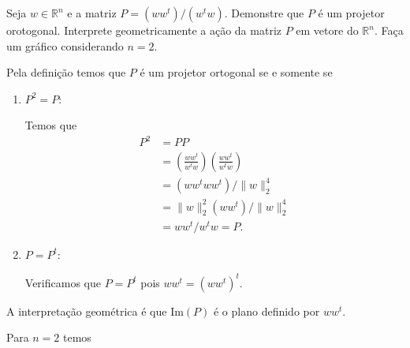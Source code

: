 \documentclass[a4paper,12pt, leqno, answers]{exam}
\begin{document}
\begin{questions}
    \question Seja $w \in \mathbb{R}^n$ e a matriz $P = \left( w w^t \right) / \left( w^t w \right)$. Demonstre que $P$ \'{e} um projetor orotogonal. Interprete geometricamente a a\c{c}\~{a}o da matriz $P$ em vetore do $\mathbb{R}^n$. Fa\c{c}a um gr\'{a}fico considerando $n = 2$.
    \begin{solution}
        Pela defini\c{c}\~{a}o temos que $P$ \'{e} um projetor ortogonal se e somente se
        \begin{enumerate}
            \item $P^2 = P$:
                
                Temos que
                \begin{align*}
                    P^2 &= P P \\
                    &= \left( \frac{w w^t}{w^t w} \right) \left( \frac{w w^t}{w^t w} \right) \\
                    &= \left( w w^t w w^t \right) / \| w \|_2^4 \\
                    &= \| w \|_2^2 \left( w w^t \right) / \| w \|_2^4 \\
                    &= w w^t / w^t w = P.
                \end{align*}

            \item $P = P^t$:
                
                Verificamos que $P = P^t$ pois $w w^t = \left( w w^t \right)^t$.
        \end{enumerate}

        A interpreta\c{c}\~{a}o geom\'{e}trica \'{e} que $\text{Im}(P)$ \'{e} o plano definido por $w w^t$.

        Para $n = 2$ temos
        \begin{center}
\end{center}
\end{solution}
\end{questions}
\end{document}
